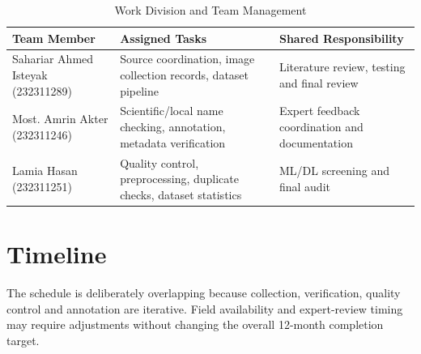 \documentclass[12pt,a4paper]{article}
\begin{document}
\begin{table}[H]
\centering
\caption{Work Division and Team Management}
\label{tab:work-division}
\begin{tabularx}{\textwidth}{|p{1.5in}|X|p{1.5in}|}
\hline
\textbf{Team Member} & \textbf{Assigned Tasks} & \textbf{Shared Responsibility} \\
\hline
Sahariar Ahmed Isteyak (232311289) & Source coordination, image collection records, dataset pipeline & Literature review, testing and final review \\
\hline
Most. Amrin Akter (232311246) & Scientific/local name checking, annotation, metadata verification & Expert feedback coordination and documentation \\
\hline
Lamia Hasan (232311251) & Quality control, preprocessing, duplicate checks, dataset statistics & ML/DL screening and final audit \\
\hline
\end{tabularx}
\end{table}


\section{Timeline}

The schedule is deliberately overlapping because collection, verification, quality control and annotation are iterative. Field availability and expert-review timing may require adjustments without changing the overall 12-month completion target.
\end{document}
